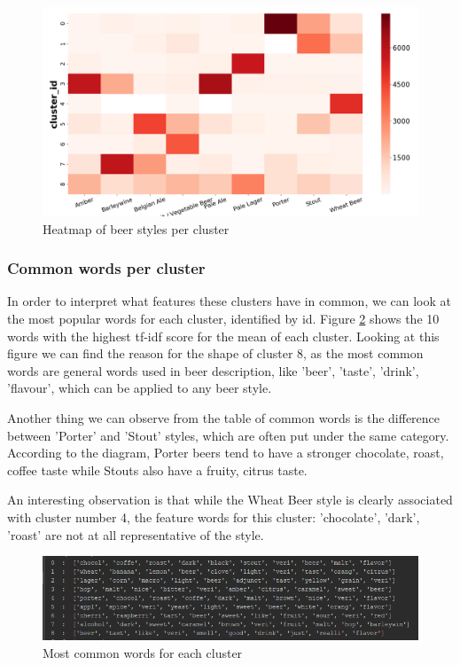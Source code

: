 \documentclass[12pt]{article}
\begin{document}
	\begin{figure}
		\includegraphics[width=\linewidth]{resources/9500rheatmap.png}
		\caption{Heatmap of beer styles per cluster}
		\label{fig:heatmap}
	\end{figure}
	
	\subsubsection{Common words per cluster}
	In order to interpret what features these clusters have in common, we can look at the most popular words for each cluster, identified by id. Figure \ref{fig:words} shows the 10 words with the highest tf-idf score for the mean of each cluster. Looking at this figure we can find the reason for the shape of cluster 8, as the most common words are general words used in beer description, like 'beer', 'taste', 'drink', 'flavour', which can be applied to any beer style. 
	
	Another thing we can observe from the table of common words is the difference between 'Porter' and 'Stout' styles, which are often put under the same category. According to the diagram, Porter beers tend to have a stronger chocolate, roast, coffee taste while Stouts also have a fruity, citrus taste.
	
	An interesting observation is that while the Wheat Beer style is clearly associated with cluster number 4, the feature words for this cluster: 'chocolate', 'dark', 'roast' are not at all representative of the style.
	
	\begin{figure}
		\includegraphics[width=\linewidth]{resources/words.png}
		\caption{Most common words for each cluster}
		\label{fig:words}
	\end{figure}
	
\end{document}
